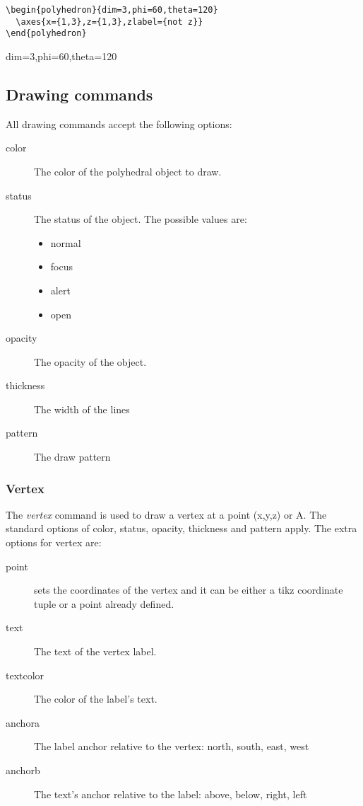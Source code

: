 \documentclass[a4paper]{article}
\begin{document}
\begin{center}
  \begin{minipage}{0.6\textwidth}
  \begin{lstlisting}
\begin{polyhedron}{dim=3,phi=60,theta=120}
  \axes{x={1,3},z={1,3},zlabel={not z}}
\end{polyhedron}
  \end{lstlisting}
  \end{minipage}
  \qquad\qquad
  \begin{minipage}{0.2\textwidth}
    \begin{polyhedron}{dim=3,phi=60,theta=120}
    \end{polyhedron}
  \end{minipage}
\end{center}



\subsection{Drawing commands}

All drawing commands accept the following options:
\begin{description}
 \item[color] The color of the polyhedral object to draw.
 \item[status] The status of the object. The possible values are:
    \begin{itemize}
     \item normal
     \item focus
     \item alert
     \item open
    \end{itemize}
 \item[opacity] The opacity of the object.
 \item[thickness] The width of the lines
 \item[pattern] The draw pattern
\end{description}

\subsubsection{Vertex}

The \emph{vertex} command is used to draw a vertex at a point (x,y,z) or A.
The standard options of  color, status, opacity, thickness and pattern apply.
The extra options for vertex are:
\begin{description}
 \item[point]  sets the coordinates of the vertex and it can be either a tikz
	      coordinate tuple or a point already defined.
 \item[text] The text of the vertex label.
 \item[textcolor] The color of the label's text.
 \item[anchora] The label anchor relative to the vertex: north, south, east,
      west
 \item[anchorb] The text's anchor relative to the label: above, below, right,
      left
\end{description}
\end{document}
